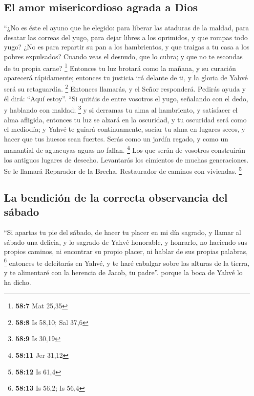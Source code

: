 \begin{paracol}{2}
\hypertarget{el-amor-misericordioso-agrada-a-dios}{%
\subsection{El amor misericordioso agrada a
Dios}\label{el-amor-misericordioso-agrada-a-dios}}

 ``¿No es éste el ayuno que he elegido: para liberar las
ataduras de la maldad, para desatar las correas del yugo, para dejar
libres a los oprimidos, y que rompas todo yugo?  ¿No es
para repartir su pan a los hambrientos, y que traigas a tu casa a los
pobres expulsados? Cuando veas el desnudo, que lo cubra; y que no te
escondas de tu propia carne? \footnote{\textbf{58:7} Mat 25,35}
 Entonces tu luz brotará como la mañana, y su curación
aparecerá rápidamente; entonces tu justicia irá delante de ti, y la
gloria de Yahvé será su retaguardia. \footnote{\textbf{58:8} Is 58,10;
  Sal 37,6}  Entonces llamarás, y el Señor responderá.
Pedirás ayuda y él dirá: ``Aquí estoy''. ``Si quitáis de entre vosotros
el yugo, señalando con el dedo, y hablando con maldad; \footnote{\textbf{58:9}
  Is 30,19}  y si derramas tu alma al hambriento, y
satisfacer el alma afligida, entonces tu luz se alzará en la oscuridad,
y tu oscuridad será como el mediodía;  y Yahvé te guiará
continuamente, saciar tu alma en lugares secos, y hacer que tus huesos
sean fuertes. Serás como un jardín regado, y como un manantial de
aguacuyas aguas no fallan. \footnote{\textbf{58:11} Jer 31,12}
 Los que serán de vosotros construirán los antiguos
lugares de desecho. Levantarás los cimientos de muchas generaciones. Se
le llamará Reparador de la Brecha, Restaurador de caminos con viviendas.
\footnote{\textbf{58:12} Is 61,4}

\hypertarget{la-bendiciuxf3n-de-la-correcta-observancia-del-suxe1bado}{%
\subsection{La bendición de la correcta observancia del
sábado}\label{la-bendiciuxf3n-de-la-correcta-observancia-del-suxe1bado}}

 ``Si apartas tu pie del sábado, de hacer tu placer en mi
día sagrado, y llamar al sábado una delicia, y lo sagrado de Yahvé
honorable, y honrarlo, no haciendo sus propios caminos, ni encontrar su
propio placer, ni hablar de sus propias palabras, \footnote{\textbf{58:13}
  Is 56,2; Is 56,4}  entonces te deleitarás en Yahvé, y
te haré cabalgar sobre las alturas de la tierra, y te alimentaré con la
herencia de Jacob, tu padre''. porque la boca de Yahvé lo ha dicho.


\end{paracol}
